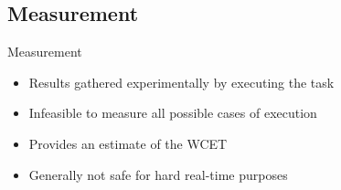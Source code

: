 \documentclass{beamer}
\begin{document}
\subsection{Measurement}
\begin{frame}{Measurement}
  \begin{itemize}
    \item Results gathered experimentally by executing the task
    \item Infeasible to measure all possible cases of execution
    \item Provides an estimate of the WCET
    \item Generally not safe for hard real-time purposes
  \end{itemize}
\end{frame}
\end{document}
